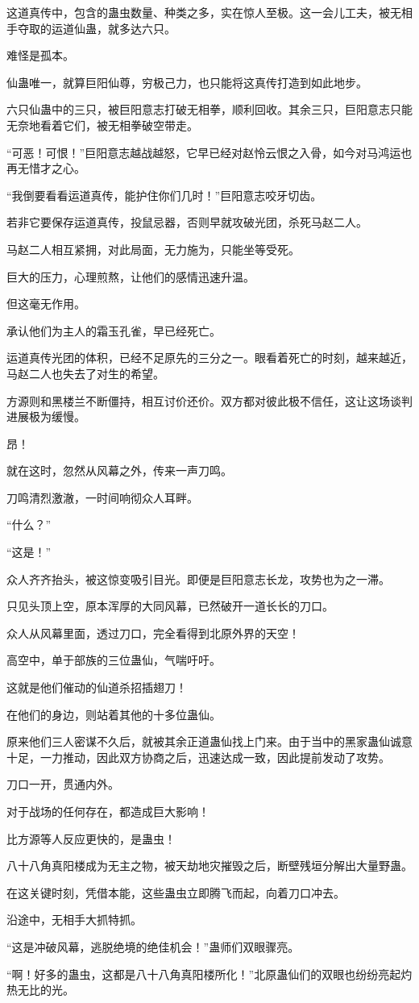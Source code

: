 \begin{this_body}
这道真传中，包含的蛊虫数量、种类之多，实在惊人至极。这一会儿工夫，被无相手夺取的运道仙蛊，就多达六只。

难怪是孤本。

仙蛊唯一，就算巨阳仙尊，穷极己力，也只能将这真传打造到如此地步。

六只仙蛊中的三只，被巨阳意志打破无相拳，顺利回收。其余三只，巨阳意志只能无奈地看着它们，被无相拳破空带走。

“可恶！可恨！”巨阳意志越战越怒，它早已经对赵怜云恨之入骨，如今对马鸿运也再无惜才之心。

“我倒要看看运道真传，能护住你们几时！”巨阳意志咬牙切齿。

若非它要保存运道真传，投鼠忌器，否则早就攻破光团，杀死马赵二人。

马赵二人相互紧拥，对此局面，无力施为，只能坐等受死。

巨大的压力，心理煎熬，让他们的感情迅速升温。

但这毫无作用。

承认他们为主人的霜玉孔雀，早已经死亡。

运道真传光团的体积，已经不足原先的三分之一。眼看着死亡的时刻，越来越近，马赵二人也失去了对生的希望。

方源则和黑楼兰不断僵持，相互讨价还价。双方都对彼此极不信任，这让这场谈判进展极为缓慢。

昂！

就在这时，忽然从风幕之外，传来一声刀鸣。

刀鸣清烈激澈，一时间响彻众人耳畔。

“什么？”

“这是！”

众人齐齐抬头，被这惊变吸引目光。即便是巨阳意志长龙，攻势也为之一滞。

只见头顶上空，原本浑厚的大同风幕，已然破开一道长长的刀口。

众人从风幕里面，透过刀口，完全看得到北原外界的天空！

高空中，单于部族的三位蛊仙，气喘吁吁。

这就是他们催动的仙道杀招插翅刀！

在他们的身边，则站着其他的十多位蛊仙。

原来他们三人密谋不久后，就被其余正道蛊仙找上门来。由于当中的黑家蛊仙诚意十足，一力推动，因此双方协商之后，迅速达成一致，因此提前发动了攻势。

刀口一开，贯通内外。

对于战场的任何存在，都造成巨大影响！

比方源等人反应更快的，是蛊虫！

八十八角真阳楼成为无主之物，被天劫地灾摧毁之后，断壁残垣分解出大量野蛊。

在这关键时刻，凭借本能，这些蛊虫立即腾飞而起，向着刀口冲去。

沿途中，无相手大抓特抓。

“这是冲破风幕，逃脱绝境的绝佳机会！”蛊师们双眼骤亮。

“啊！好多的蛊虫，这都是八十八角真阳楼所化！”北原蛊仙们的双眼也纷纷亮起灼热无比的光。

\end{this_body}

